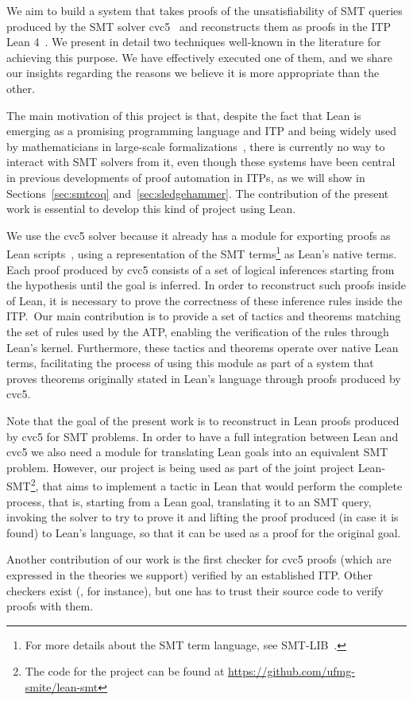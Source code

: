 We aim to build a system that takes proofs of the unsatisfiability of
SMT queries produced by the SMT solver cvc5~\cite{cvc5} and
reconstructs them as proofs in the ITP Lean 4~\cite{lean}.
We present in detail two techniques well-known in the literature for achieving this purpose.
We have effectively executed one of them, and we share our insights
regarding the reasons we believe it is more appropriate than the other.

The main motivation of this project is that, despite the fact that Lean is
emerging as a promising programming language and ITP and being
widely used by mathematicians in large-scale
formalizations~\cite{scholze, mathlib}, there is currently no way to
interact with SMT solvers from it, even though these systems have been
central in previous developments of proof automation in ITPs, as we will show in Sections~\ref{sec:smtcoq}
and~\ref{sec:sledgehammer}. The contribution of the present work
is essential to develop this kind of project using Lean.

We use the cvc5 solver because it already has a module for exporting proofs as
Lean scripts~\cite{Barbosa2022}, using a representation of the SMT terms\footnote{For more details
about the SMT term language, see SMT-LIB~\cite{smtlib}.} as Lean's native terms.
Each proof produced by cvc5 consists of a set of logical inferences starting from the
hypothesis until the goal is inferred. In order to reconstruct such proofs inside of
Lean, it is necessary to prove the correctness of these inference rules inside the
ITP.\ Our main contribution is to provide a set of tactics and theorems matching the set
of rules used by the ATP, enabling the verification of the rules through Lean's kernel.
Furthermore, these tactics and theorems operate over native Lean terms, facilitating the
process of using this module as part of a system that proves theorems originally stated
in Lean's language through proofs produced by cvc5.

Note that the goal of the present work is to reconstruct in Lean proofs produced by
cvc5 for SMT problems. In order to have a full integration between Lean and cvc5 we also
need a module for translating Lean goals into an equivalent SMT problem.
However, our project is being used as part of the joint project Lean-SMT\footnote{The
  code for the project can be found at \url{https://github.com/ufmg-smite/lean-smt}},
that aims to implement a tactic in Lean that would perform the complete process, that is,
starting from a Lean goal, translating it to an SMT query, invoking the solver to try
to prove it and lifting the proof produced (in case it is found) to Lean's language,
so that it can be used as a proof for the original goal.

Another contribution of our work is the first checker for cvc5 proofs
(which are expressed in the theories we support)
verified by an established ITP.
Other checkers exist (\cite{carcara}, for instance), but one has to
trust their source code to verify proofs with them.
